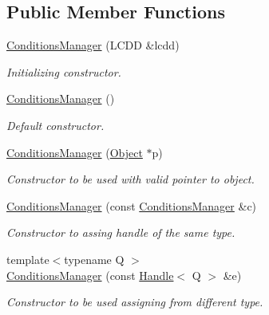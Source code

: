 \subsection*{Public Member Functions}
\begin{DoxyCompactItemize}
\item 
\hyperlink{class_d_d4hep_1_1_conditions_1_1_conditions_manager_afa92512839fc9d260fc8cfa1502a5836}{ConditionsManager} (LCDD \&lcdd)
\begin{DoxyCompactList}\small\item\em Initializing constructor. \item\end{DoxyCompactList}\item 
\hyperlink{class_d_d4hep_1_1_conditions_1_1_conditions_manager_a658c7e6a109d66c52310db6bc786582f}{ConditionsManager} ()
\begin{DoxyCompactList}\small\item\em Default constructor. \item\end{DoxyCompactList}\item 
\hyperlink{class_d_d4hep_1_1_conditions_1_1_conditions_manager_a01b34e91e804ce2dea5d8e363f924d29}{ConditionsManager} (\hyperlink{class_d_d4hep_1_1_conditions_1_1_conditions_manager_object}{Object} $\ast$p)
\begin{DoxyCompactList}\small\item\em Constructor to be used with valid pointer to object. \item\end{DoxyCompactList}\item 
\hyperlink{class_d_d4hep_1_1_conditions_1_1_conditions_manager_a7ff6e3f2b2c93d5ac2245ce62ff5f34f}{ConditionsManager} (const \hyperlink{class_d_d4hep_1_1_conditions_1_1_conditions_manager}{ConditionsManager} \&c)
\begin{DoxyCompactList}\small\item\em Constructor to assing handle of the same type. \item\end{DoxyCompactList}\item 
{\footnotesize template$<$typename Q $>$ }\\\hyperlink{class_d_d4hep_1_1_conditions_1_1_conditions_manager_a36b71a071ec86983838c34bcaf215625}{ConditionsManager} (const \hyperlink{class_d_d4hep_1_1_handle}{Handle}$<$ Q $>$ \&e)
\begin{DoxyCompactList}\small\item\em Constructor to be used assigning from different type. \item\end{DoxyCompactList}\item 

\end{DoxyCompactItemize}
